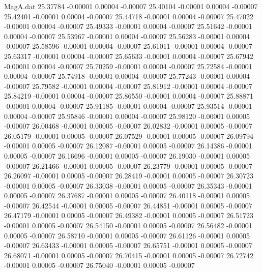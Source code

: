 \begin{filecontents}{MagA.dat}
  25.37784   -0.00001    0.00004   -0.00007
  25.40104   -0.00001    0.00004   -0.00007
  25.42401   -0.00001    0.00004   -0.00007
  25.44718   -0.00001    0.00004   -0.00007
  25.47022   -0.00001    0.00004   -0.00007
  25.49333   -0.00001    0.00004   -0.00007
  25.51642   -0.00001    0.00004   -0.00007
  25.53967   -0.00001    0.00004   -0.00007
  25.56283   -0.00001    0.00004   -0.00007
  25.58596   -0.00001    0.00004   -0.00007
  25.61011   -0.00001    0.00004   -0.00007
  25.63317   -0.00001    0.00004   -0.00007
  25.65633   -0.00001    0.00004   -0.00007
  25.67942   -0.00001    0.00004   -0.00007
  25.70259   -0.00001    0.00004   -0.00007
  25.72584   -0.00001    0.00004   -0.00007
  25.74918   -0.00001    0.00004   -0.00007
  25.77243   -0.00001    0.00004   -0.00007
  25.79582   -0.00001    0.00004   -0.00007
  25.81912   -0.00001    0.00004   -0.00007
  25.84219   -0.00001    0.00004   -0.00007
  25.86550   -0.00001    0.00004   -0.00007
  25.88871   -0.00001    0.00004   -0.00007
  25.91185   -0.00001    0.00004   -0.00007
  25.93514   -0.00001    0.00004   -0.00007
  25.95846   -0.00001    0.00004   -0.00007
  25.98120   -0.00001    0.00005   -0.00007
  26.00468   -0.00001    0.00005   -0.00007
  26.02832   -0.00001    0.00005   -0.00007
  26.05179   -0.00001    0.00005   -0.00007
  26.07529   -0.00001    0.00005   -0.00007
  26.09794   -0.00001    0.00005   -0.00007
  26.12087   -0.00001    0.00005   -0.00007
  26.14386   -0.00001    0.00005   -0.00007
  26.16696   -0.00001    0.00005   -0.00007
  26.19030   -0.00001    0.00005   -0.00007
  26.21466   -0.00001    0.00005   -0.00007
  26.23779   -0.00001    0.00005   -0.00007
  26.26097   -0.00001    0.00005   -0.00007
  26.28419   -0.00001    0.00005   -0.00007
  26.30723   -0.00001    0.00005   -0.00007
  26.33038   -0.00001    0.00005   -0.00007
  26.35343   -0.00001    0.00005   -0.00007
  26.37687   -0.00001    0.00005   -0.00007
  26.40118   -0.00001    0.00005   -0.00007
  26.42544   -0.00001    0.00005   -0.00007
  26.44851   -0.00001    0.00005   -0.00007
  26.47179   -0.00001    0.00005   -0.00007
  26.49382   -0.00001    0.00005   -0.00007
  26.51723   -0.00001    0.00005   -0.00007
  26.54150   -0.00001    0.00005   -0.00007
  26.56482   -0.00001    0.00005   -0.00007
  26.58710   -0.00001    0.00005   -0.00007
  26.61126   -0.00001    0.00005   -0.00007
  26.63433   -0.00001    0.00005   -0.00007
  26.65751   -0.00001    0.00005   -0.00007
  26.68071   -0.00001    0.00005   -0.00007
  26.70415   -0.00001    0.00005   -0.00007
  26.72742   -0.00001    0.00005   -0.00007
  26.75040   -0.00001    0.00005   -0.00007

\end{filecontents}
